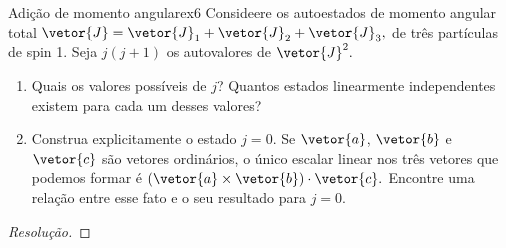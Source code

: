 \begin{exercício}{Adição de momento angular}{ex6}
    Consideere os autoestados de momento angular total \(\vetor{J} = \vetor{J}_1 + \vetor{J}_2 + \vetor{J}_3,\) de três partículas de spin 1. Seja \(j(j+1)\) os autovalores de \(\vetor{J}^2.\)
    \begin{enumerate}[label=(\alph*)]
        \item Quais os valores possíveis de \(j\)? Quantos estados linearmente independentes existem para cada um desses valores?
        \item Construa explicitamente o estado \(j = 0.\) Se \(\vetor{a}\), \(\vetor{b}\) e \(\vetor{c}\) são vetores ordinários, o único escalar linear nos três vetores que podemos formar é \((\vetor{a} \times \vetor{b}) \cdot \vetor{c}.\) Encontre uma relação entre esse fato e o seu resultado para \(j = 0.\)
    \end{enumerate}
\end{exercício}
\begin{proof}[Resolução]
    
\end{proof}
